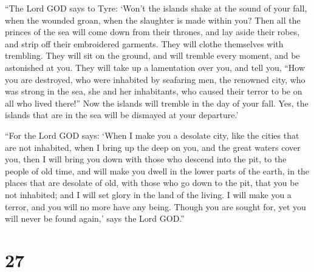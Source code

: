  ``The Lord GOD says to Tyre: `Won't the islands shake at
the sound of your fall, when the wounded groan, when the slaughter is
made within you?  Then all the princes of the sea will
come down from their thrones, and lay aside their robes, and strip off
their embroidered garments. They will clothe themselves with trembling.
They will sit on the ground, and will tremble every moment, and be
astonished at you.  They will take up a lamentation over
you, and tell you, ``How you are destroyed, who were inhabited by
seafaring men, the renowned city, who was strong in the sea, she and her
inhabitants, who caused their terror to be on all who lived there!''
 Now the islands will tremble in the day of your fall.
Yes, the islands that are in the sea will be dismayed at your
departure.'

 ``For the Lord GOD says: `When I make you a desolate
city, like the cities that are not inhabited, when I bring up the deep
on you, and the great waters cover you,  then I will
bring you down with those who descend into the pit, to the people of old
time, and will make you dwell in the lower parts of the earth, in the
places that are desolate of old, with those who go down to the pit, that
you be not inhabited; and I will set glory in the land of the living.
 I will make you a terror, and you will no more have any
being. Though you are sought for, yet you will never be found again,'
says the Lord GOD.''

\hypertarget{section-26}{%
\section{27}\label{section-26}}

